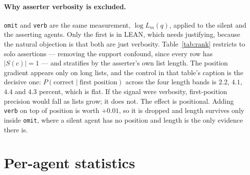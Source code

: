 \documentclass{article}
\begin{document}
\paragraph{Why asserter verbosity is excluded.}
\texttt{omit} and \texttt{verb} are the same measurement, $\log L_m(q)$, applied to the silent and the asserting agents. Only the first is in LEAN, which needs justifying, because the natural objection is that both are just verbosity. Table~\ref{tab:rank} restricts to solo assertions --- removing the support confound, since every row has $|S(c)|=1$ --- and stratifies by the asserter's own list length. The position gradient appears only on long lists, and the control in that table's caption is the decisive one: $P(\mathrm{correct} \mid \text{first position})$ across the four length bands is $2.2$, $4.1$, $4.4$ and $4.3$ percent, which is flat. If the signal were verbosity, first-position precision would fall as lists grow; it does not. The effect is positional. Adding \texttt{verb} on top of position is worth $+0.01$, so it is dropped and length survives only inside \texttt{omit}, where a silent agent has no position and length is the only evidence there is.

\section{Per-agent statistics}
\label{app:agents}
\end{document}
